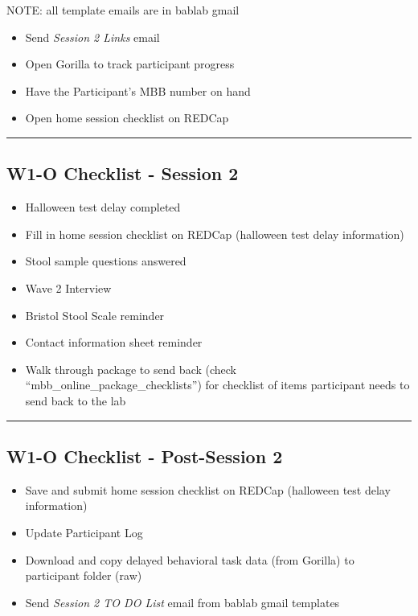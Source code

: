 \documentclass[
]{book}
\providecommand{\tightlist}{%
  \setlength{\itemsep}{0pt}\setlength{\parskip}{0pt}}
\begin{document}
NOTE: all template emails are in bablab gmail

\begin{itemize}
\tightlist
\item
  Send \emph{Session 2 Links} email
\item
  Open Gorilla to track participant progress
\item
  Have the Participant's MBB number on hand
\item
  Open home session checklist on REDCap
\end{itemize}

\begin{center}\rule{0.5\linewidth}{0.5pt}\end{center}

\hypertarget{w1-o-checklist---session-2}{%
\subsection{W1-O Checklist - Session 2}\label{w1-o-checklist---session-2}}

\begin{itemize}
\tightlist
\item
  Halloween test delay completed
\item
  Fill in home session checklist on REDCap (halloween test delay information)
\item
  Stool sample questions answered
\item
  Wave 2 Interview
\item
  Bristol Stool Scale reminder
\item
  Contact information sheet reminder
\item
  Walk through package to send back (check ``mbb\_online\_package\_checklists'') for checklist of items participant needs to send back to the lab
\end{itemize}

\begin{center}\rule{0.5\linewidth}{0.5pt}\end{center}

\hypertarget{w1-o-checklist---post-session-2}{%
\subsection{W1-O Checklist - Post-Session 2}\label{w1-o-checklist---post-session-2}}

\begin{itemize}
\tightlist
\item
  Save and submit home session checklist on REDCap (halloween test delay information)
\item
  Update Participant Log
\item
  Download and copy delayed behavioral task data (from Gorilla) to participant folder (raw)
\item
  Send \emph{Session 2 TO DO List} email from bablab gmail templates
\end{itemize}
\end{document}
